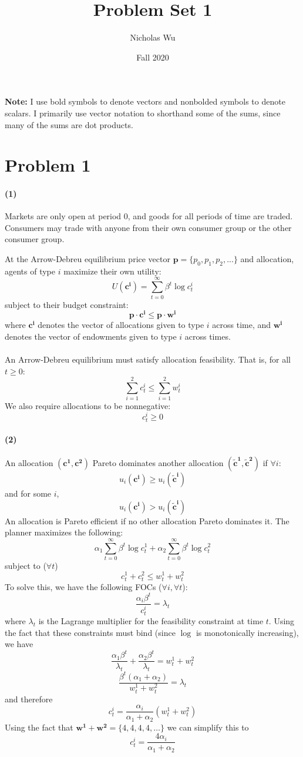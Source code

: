 \documentclass[10pt,letter]{article}
\renewcommand{\vector}[1]{\boldsymbol{#1}}
\newcommand{\problem}[1]{\section*{Problem #1}}
\newcommand{\problempart}[1]{\paragraph{#1}}
\begin{document}


\title{Problem Set 1}

\author{Nicholas Wu}

\date{Fall 2020}

\maketitle
\textbf{Note:} I use bold symbols to denote vectors and nonbolded symbols to denote scalars. I primarily use vector notation to shorthand some of the sums, since many of the sums are dot products.

\problem{1}

\problempart{(1)} Markets are only open at period 0, and goods for all periods of time are traded. Consumers may trade with anyone from their own consumer group or the other consumer group.

At the Arrow-Debreu equilibrium price vector $\vector{p} = \{p_0, p_1, p_2, ... \}$ and allocation, agents of type $i$ maximize their own utility:
\[ U(\vector{c^i}) = \sum_{t=0}^\infty \beta^t \log c^i_t \]
 subject to their budget constraint:
\[ \vector{p}\cdot \vector{c^i} \le \vector{p}\cdot \vector{w^i} \]
where $\vector{c^i}$ denotes the vector of allocations given to type $i$ across time, and $\vector{w^i}$ denotes the vector of endowments given to type $i$ across times. \\\\
An Arrow-Debreu equilibrium must satisfy allocation feasibility. That is, for all $t \ge 0$:
\[ \sum_{i=1}^2 c^i_t \le \sum_{i=1}^2 w^i_t \]
We also require allocations to be nonnegative:
\[ c^i_t \ge 0 \]
\problempart{(2)}
An allocation $(\vector{c^1}, \vector{c^2} )$ Pareto dominates another allocation $(\vector{\tilde{c}^1},\vector{\tilde{c}^2})$ if $\forall i$:
\[ u_i(\vector{c^i}) \ge u_i(\vector{\tilde{c}^i}) \]
and for some $i$,
\[ u_i(\vector{c^i}) > u_i(\vector{\tilde{c}^i}) \]
An allocation is Pareto efficient if no other allocation Pareto dominates it. The planner maximizes the following:
\[ \alpha_1 \sum_{t=0}^\infty \beta^t \log c^1_t + \alpha_2 \sum_{t=0}^\infty \beta^t \log c^2_t  \]
subject to ($\forall t$)
\[ c^1_t + c^2_t \le w^1_t + w^2_t \]
To solve this, we have the following FOCs ($\forall i, \forall t$):
\[ \frac{\alpha_i \beta^t}{c^i_t} = \lambda_{t}  \]
where $\lambda_t$ is the Lagrange multiplier for the feasibility constraint at time $t$. Using the fact that these constraints must bind (since $\log$ is monotonically increasing), we have
\[ \frac{\alpha_1 \beta^t}{\lambda_{t}} + \frac{\alpha_2 \beta^t}{\lambda_t} = w^1_t + w^2_t \]
\[ \frac{\beta^t(\alpha_1 + \alpha_2)}{w^1_t + w^2_t} = \lambda_t \]
and therefore
\[ c^i_t = \frac{\alpha_i}{\alpha_1 + \alpha_2}(w^1_t + w^2_t) \]
Using the fact that
$ \vector{w^1} + \vector{w^2} = \{4, 4, 4, 4, \dots\} $
we can simplify this to
\[ c^i_t = \frac{4\alpha_i}{\alpha_1 + \alpha_2}\]
\end{document}
